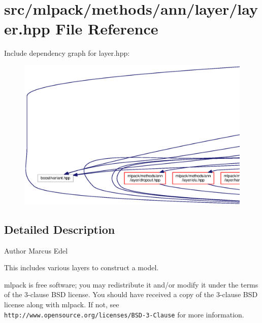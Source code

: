 \section{src/mlpack/methods/ann/layer/layer.hpp File Reference}
\label{layer_8hpp}
Include dependency graph for layer.\+hpp\+:
\nopagebreak
\begin{figure}[H]
\begin{center}
\leavevmode
\includegraphics[width=350pt]{layer_8hpp__incl}
\end{center}
\end{figure}


\subsection{Detailed Description}
\begin{DoxyAuthor}{Author}
Marcus Edel
\end{DoxyAuthor}
This includes various layers to construct a model.

mlpack is free software; you may redistribute it and/or modify it under the terms of the 3-\/clause B\+SD license. You should have received a copy of the 3-\/clause B\+SD license along with mlpack. If not, see {\tt http\+://www.\+opensource.\+org/licenses/\+B\+S\+D-\/3-\/\+Clause} for more information. 